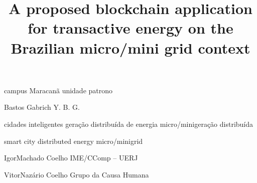 
            {campus Maracanã} 
            {unidade} 
            {patrono} 

      {Bastos Gabrich}
      {Y. B. G.}

\title{A proposed blockchain application for transactive energy on the Brazilian micro/mini grid context}
         {cidades inteligentes}
         {geração distribuída de energia}
         {micro/minigeração distribuída}

               {smart city}
               {distributed energy}
               {micro/minigrid}

           {Igor}{Machado Coelho} 
           {IME/CComp -- UERJ} 

             {Vitor}{Nazário Coelho} 
             {Grupo da Causa Humana} 



